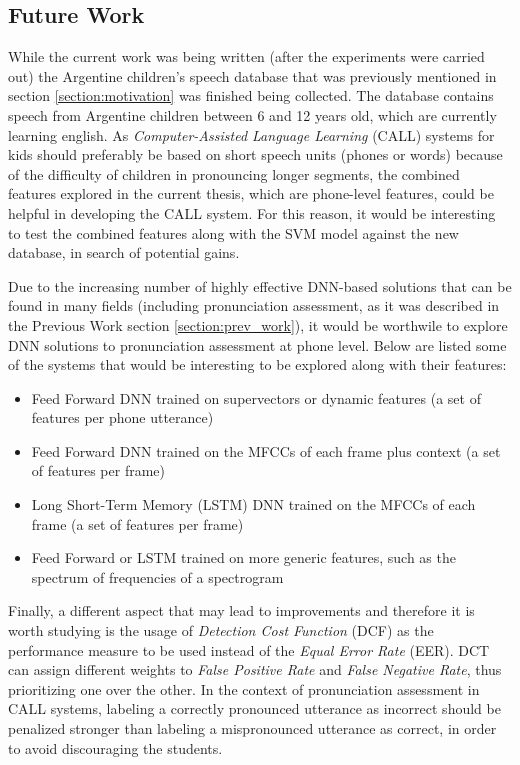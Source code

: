 \color{red}
\subsection{Future Work}

While the current work was being written (after the experiments were carried out)
the Argentine children's speech database that was previously mentioned in section
\ref{section:motivation} was finished being collected. The database contains speech
from Argentine children between 6 and 12 years old, which are currently learning
english. As \textit{Computer-Assisted Language Learning} (CALL) systems
for kids should preferably be based on short speech units (phones or words) because
of the difficulty of children in pronouncing longer segments, the combined features
explored in the current thesis, which are phone-level features, could be helpful
in developing the CALL system. For this reason, it would be interesting to test
the combined features along with the SVM model against the new database, in search
of potential gains.

Due to the increasing number of highly effective DNN-based solutions that can be found in
many fields (including pronunciation assessment,
as it was described in the Previous Work section \ref{section:prev_work}),
it would be worthwile to explore DNN solutions to pronunciation assessment
at phone level. Below are listed some of the systems that would be interesting to be explored
along with their features:

\begin{itemize}
  \item Feed Forward DNN trained on supervectors or dynamic features (a set of features per phone utterance)
  \item Feed Forward DNN trained on the MFCCs of each frame plus context (a set of features per frame)
  \item Long Short-Term Memory (LSTM) DNN trained on the MFCCs of each frame (a set of features per frame)
  \item Feed Forward or LSTM trained on more generic features, such as the spectrum of frequencies of a spectrogram
\end{itemize}

Finally, a different aspect that may lead to improvements and therefore it is worth studying
is the usage of \textit{Detection Cost Function} (DCF) as the performance measure
to be used instead of the \textit{Equal Error Rate} (EER). DCT can assign different
weights to \textit{False Positive Rate} and \textit{False Negative Rate}, thus
prioritizing one over the other. In the context of pronunciation assessment in
CALL systems, labeling a correctly pronounced utterance as incorrect should be
penalized stronger than labeling a mispronounced utterance as correct, in order
to avoid discouraging the students.

\color{black}
